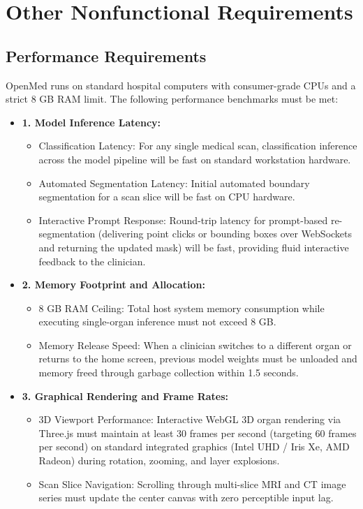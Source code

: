 \documentclass[12pt,a4paper]{report}
\begin{document}
\section{Other Nonfunctional Requirements}

\subsection{Performance Requirements}
OpenMed runs on standard hospital computers with consumer-grade CPUs and a strict 8 GB RAM limit. The following performance benchmarks must be met:

\begin{itemize}[leftmargin=1.2em]
    \item \textbf{1. Model Inference Latency:}
    \begin{itemize}[leftmargin=1.2em]
        \item Classification Latency: For any single medical scan, classification inference across the model pipeline will be fast on standard workstation hardware.
        \item Automated Segmentation Latency: Initial automated boundary segmentation for a scan slice will be fast on CPU hardware.
        \item Interactive Prompt Response: Round-trip latency for prompt-based re-segmentation (delivering point clicks or bounding boxes over WebSockets and returning the updated mask) will be fast, providing fluid interactive feedback to the clinician.
    \end{itemize}

    \item \textbf{2. Memory Footprint and Allocation:}
    \begin{itemize}[leftmargin=1.2em]
        \item 8 GB RAM Ceiling: Total host system memory consumption while executing single-organ inference must not exceed 8 GB.
        \item Memory Release Speed: When a clinician switches to a different organ or returns to the home screen, previous model weights must be unloaded and memory freed through garbage collection within 1.5 seconds.
    \end{itemize}

    \item \textbf{3. Graphical Rendering and Frame Rates:}
    \begin{itemize}[leftmargin=1.2em]
        \item 3D Viewport Performance: Interactive WebGL 3D organ rendering via Three.js must maintain at least 30 frames per second (targeting 60 frames per second) on standard integrated graphics (Intel UHD / Iris Xe, AMD Radeon) during rotation, zooming, and layer explosions.
        \item Scan Slice Navigation: Scrolling through multi-slice MRI and CT image series must update the center canvas with zero perceptible input lag.
    \end{itemize}


\end{itemize}
\end{document}
